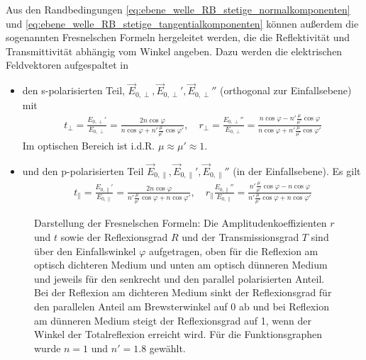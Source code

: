 Aus den Randbedingungen \eqref{eq:ebene_welle_RB_stetige_normalkomponenten} und \eqref{eq:ebene_welle_RB_stetige_tangentialkomponenten} können außerdem die sogenannten Fresnelschen Formeln hergeleitet werden, die die Reflektivität und Transmittivität abhängig vom Winkel angeben.
Dazu werden die elektrischen Feldvektoren aufgespaltet in
\begin{itemize}
    \item den s-polarisierten Teil, $\vec E_{0,\perp},\vec E_{0,\perp}',\vec E_{0,\perp}''$ (orthogonal zur Einfallsebene) mit
          \begin{align}
              \label{eq:fresnel_senkrecht}
              t_\perp = \frac{E_{0,\perp}'}{E_{0,\perp}}=\frac{2n\cos\varphi}{n\cos\varphi+n'\frac{\mu}{\mu'}\cos\varphi'},\quad r_\perp = \frac{E_{0,\perp}''}{E_{0,\perp}}=\frac{n\cos\varphi-n'\frac{\mu}{\mu'}\cos\varphi}{n\cos\varphi+n'\frac{\mu}{\mu'}\cos\varphi'}
          \end{align}
          Im optischen Bereich ist i.d.R. $\mu\approx\mu'\approx 1$.
    \item und den p-polarisierten Teil $\vec E_{0,\parallel},\vec E_{0,\parallel}',\vec E_{0,\parallel}''$ (in der Einfallsebene). Es gilt
          \begin{align}
              \label{eq:fresnel_parallel}
              t_\parallel = \frac{E_{0,\parallel}'}{E_{0,\parallel}}=\frac{2n\cos\varphi}{n'\frac{\mu}{\mu'}\cos\varphi+n\cos\varphi'},\quad r_\parallel\frac{E_{0,\parallel}''}{E_{0,\parallel}}=\frac{n'\frac{\mu}{\mu'}\cos\varphi-n\cos\varphi}{n'\frac{\mu}{\mu'}\cos\varphi+n\cos\varphi'}
          \end{align}
\end{itemize}

\begin{figure}[htb]
    \centering
    \tfigFresnelEquations
    \caption{Darstellung der Fresnelschen Formeln: Die Amplitudenkoeffizienten $r$ und $t$ sowie der Reflexionsgrad $R$ und der Transmissionsgrad $T$ sind über den Einfallswinkel $\varphi$ aufgetragen, oben für die Reflexion am optisch dichteren Medium und unten am optisch dünneren Medium und jeweils für den senkrecht und den parallel polarisierten Anteil. Bei der Reflexion am dichteren Medium sinkt der Reflexionsgrad für den parallelen Anteil am Brewsterwinkel auf 0 ab und bei Reflexion am dünneren Medium steigt der Reflexionsgrad auf 1, wenn der Winkel der Totalreflexion erreicht wird. Für die Funktionsgraphen wurde $n=1$ und $n'=\num{1,8}$ gewählt. }
    \label{fig:fresnel_equations}
\end{figure}

